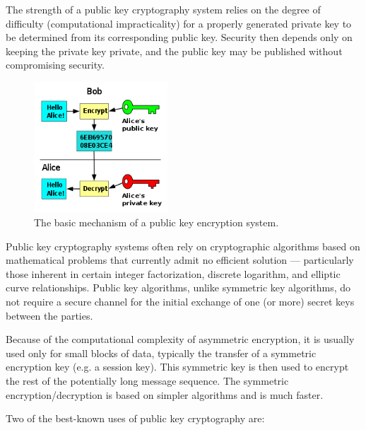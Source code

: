 \documentclass[12 pt]{article}
\begin{document}
\noindent The strength of a public key cryptography system relies on the degree of difficulty (computational impracticality) for a properly generated private key to be determined from its corresponding public key. Security then depends only on keeping the private key private, and the public key may be published without compromising security.


\begin{figure}[h!]
  \includegraphics[width=50mm]{250px-Public_key_encryption.png}
  \centering
  \caption{The basic mechanism of a public key encryption system.}
  \label{fig:PublicKey-Basic}
\end{figure}

\noindent Public key cryptography systems often rely on cryptographic algorithms based on mathematical problems that currently admit no efficient solution — particularly those inherent in certain integer factorization, discrete logarithm, and elliptic curve relationships. Public key algorithms, unlike symmetric key algorithms, do not require a secure channel for the initial exchange of one (or more) secret keys between the parties.

\noindent Because of the computational complexity of asymmetric encryption, it is usually used only for small blocks of data, typically the transfer of a symmetric encryption key (e.g. a session key). This symmetric key is then used to encrypt the rest of the potentially long message sequence. The symmetric encryption/decryption is based on simpler algorithms and is much faster.

\noindent
Two of the best-known uses of public key cryptography are:
\end{document}
